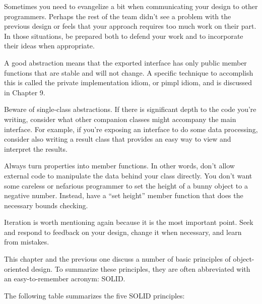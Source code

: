 Sometimes you need to evangelize a bit when communicating your design to other programmers. Perhaps the rest of the team didn’t see a problem with the previous design or feels that your approach requires too much work on their part. In those situations, be prepared both to defend your work and to incorporate their ideas when appropriate.

A good abstraction means that the exported interface has only public member functions that are stable and will not change. A specific technique to accomplish this is called the private implementation idiom, or pimpl idiom, and is discussed in Chapter 9.

Beware of single-class abstractions. If there is significant depth to the code you’re writing, consider what other companion classes might accompany the main interface. For example, if you’re exposing an interface to do some data processing, consider also writing a result class that provides an easy way to view and interpret the results.

Always turn properties into member functions. In other words, don’t allow external code to manipulate the data behind your class directly. You don’t want some careless or nefarious programmer to set the height of a bunny object to a negative number. Instead, have a “set height” member function that does the necessary bounds checking.

Iteration is worth mentioning again because it is the most important point. Seek and respond to feedback on your design, change it when necessary, and learn from mistakes.


This chapter and the previous one discuss a number of basic principles of object-oriented design. To summarize these principles, they are often abbreviated with an easy-to-remember acronym: SOLID.

The following table summarizes the five SOLID principles:

